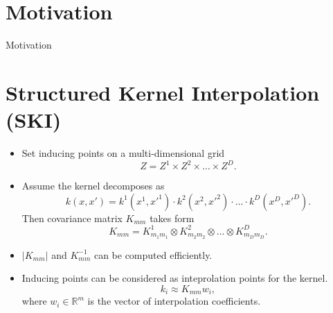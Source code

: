 \documentclass[a0,portrait]{a0poster}
\newcommand{\R}{\mathbb{R}}
\begin{document}
\begin{multicols}{2} %


%

\section*{\LARGE \color{NavyBlue}Motivation}

Motivation

\section*{\LARGE \color{NavyBlue}Structured Kernel Interpolation (SKI)}
  \citet{wilson2015}

\begin{itemize}
  \item Set inducing points on a multi-dimensional grid
    \[
      Z = Z^1 \times Z^2 \times \ldots \times Z^D.
    \]
  
  \item Assume the kernel decomposes as
    \[
      k(x, x') = k^1(x^1, x'^1) \cdot k^2(x^2, x'^2) \cdot \ldots \cdot k^D(x^D, x'^D).
    \]
    Then covariance matrix $K_{mm}$ takes form
    \[
      K_{mm} = K_{m_1 m_1}^1 \otimes K_{m_2 m_2}^2 \otimes \ldots \otimes K_{m_D m_D}^D.
    \] 

  \item $|K_{mm}|$ and $K_{mm}^{-1}$ can be computed efficiently. 
\end{itemize}
    \begin{center}
      \centering
      \scalebox{1.25}{
      
    }
    \end{center}
    
    \begin{itemize}
      \item Inducing points can be considered as inteprolation points for the
        kernel.
        \[
          k_i \approx K_{mm} w_i,
        \]
      where $w_i\in \R^{m}$ is the vector of interpolation coefficients.


\end{itemize}
\end{multicols}
\end{document}
